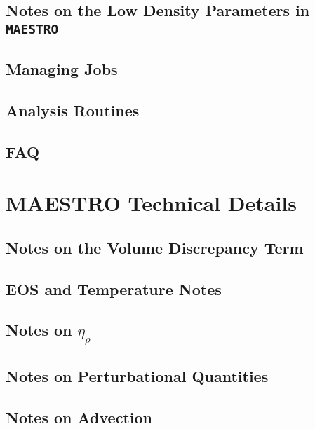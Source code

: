 \documentclass[11pt]{book}
\newcommand{\etarho}{\eta_{\rho}}
\begin{document}
\chapter{Notes on the Low Density Parameters in {\tt MAESTRO}}


\chapter{Managing Jobs}


\chapter{Analysis Routines}


\chapter{FAQ}


\part{MAESTRO Technical Details}

\chapter{Notes on the Volume Discrepancy Term}


\chapter{EOS and Temperature Notes}


\chapter{Notes on $\etarho$}


\chapter{Notes on Perturbational Quantities}


\chapter{Notes on Advection}

\end{document}
